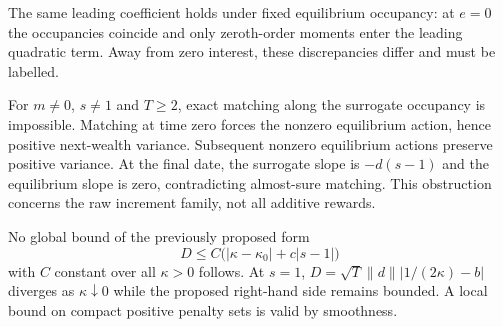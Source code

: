 The same leading coefficient holds under fixed equilibrium occupancy: at
$e=0$ the occupancies coincide and only zeroth-order moments enter the leading
quadratic term. Away from zero interest, these discrepancies differ and must be labelled.

For $m\ne0$, $s\ne1$ and $T\ge2$, exact matching along the surrogate occupancy
is impossible. Matching at time zero forces the nonzero equilibrium action,
hence positive next-wealth variance. Subsequent nonzero equilibrium actions
preserve positive variance. At the final date, the surrogate slope is $-d(s-1)$
and the equilibrium slope is zero, contradicting almost-sure matching.
This obstruction concerns the raw increment family, not all additive rewards.

No global bound of the previously proposed form
\[
 D\le C\bigl(|\kappa-\kappa_0|+c|s-1|\bigr)
\]
with $C$ constant over all $\kappa>0$ follows. At $s=1$,
$D=\sqrt{T}\|d\||1/(2\kappa)-b|$ diverges as $\kappa\downarrow0$ while the
proposed right-hand side remains bounded. A local bound on compact positive
penalty sets is valid by smoothness.

\ifdim\dimexpr\pagegoal-\pagetotal\relax<120pt\newpage\fi
